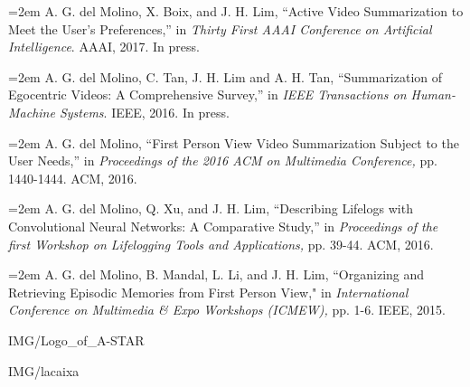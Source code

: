 \documentclass[paper=a4,fontsize=11pt]{temp} %
\begin{document}
%
\pagebreak
\sepspace

\hspace{3mm}
\begin{minipage}{0.04\linewidth}
        \hspace{\linewidth}
		\end{minipage}%
   \begin{minipage}{0.88\linewidth}
   \noindent\hangindent=2em 
    A. G. del Molino, X. Boix, and J. H. Lim, ``Active Video Summarization to Meet the User’s Preferences,'' in \textit{Thirty First AAAI Conference on Artificial Intelligence}. AAAI, 2017. In press.
    \sepspace
    
    \noindent\hangindent=2em 
    A. G. del Molino, C. Tan, J. H. Lim and A. H. Tan, ``Summarization of Egocentric Videos: A Comprehensive Survey,'' in \textit{IEEE Transactions on Human-Machine Systems}. IEEE, 2016. In press.\sepspace
    
       \noindent\hangindent=2em 
    A. G. del Molino, ``First Person View Video Summarization Subject to the User Needs,'' in \textit{Proceedings of the 2016 ACM on Multimedia Conference,} pp. 1440-1444. ACM, 2016.
\sepspace 

\noindent\hangindent=2em 
    A. G. del Molino, Q. Xu, and J. H. Lim, ``Describing Lifelogs with Convolutional Neural Networks: A Comparative Study,'' in \textit{Proceedings of the first Workshop on Lifelogging Tools and Applications,} pp. 39-44. ACM, 2016.
	\sepspace
    
       \noindent\hangindent=2em 
   A. G. del Molino, B. Mandal, L. Li, and J. H. Lim, ``Organizing and Retrieving Episodic Memories from First Person View," in \textit{International Conference on Multimedia \& Expo Workshops (ICMEW),} pp. 1-6. IEEE, 2015. %

   \end{minipage}        
\sepspace

\hspace{3mm}
\begin{minipage}[t]{0.45\textwidth}
 {IMG/Logo_of_A-STAR}
\end{minipage}
\hspace{0.02\textwidth}
\begin{minipage}[t]{0.45\textwidth}
 {IMG/lacaixa}
\end{minipage}
\end{document}
